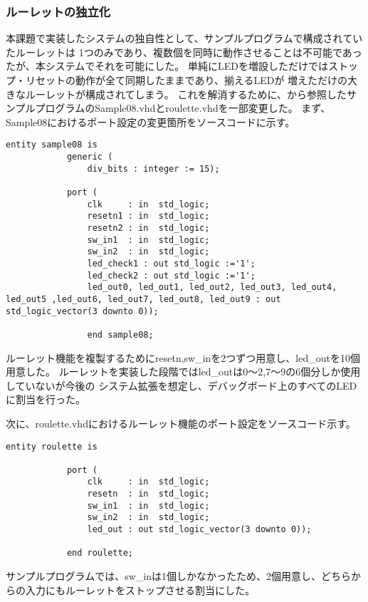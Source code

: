 \documentclass{ltjsarticle}
\begin{document}
		\subsubsection{ルーレットの独立化}
			本課題で実装したシステムの独自性として、サンプルプログラムで構成されていたルーレットは
			1つのみであり、複数個を同時に動作させることは不可能であったが、本システムでそれを可能にした。
			単純にLEDを増設しただけではストップ・リセットの動作が全て同期したままであり、揃えるLEDが
			増えただけの大きなルーレットが構成されてしまう。
			これを解消するために、\cite{ref:指導書}から参照したサンプルプログラムのSample08.vhdとroulette.vhdを一部変更した。
			まず、Sample08におけるポート設定の変更箇所をソースコードに示す。

			\begin{lstlisting}[caption = Sample08のポート設定, label = code:Sample08port]
			entity sample08 is
			generic (
				div_bits : integer := 15);
			
			port (
				clk     : in  std_logic;
				resetn1 : in  std_logic;
				resetn2 : in  std_logic;
				sw_in1  : in  std_logic;
				sw_in2  : in  std_logic;
				led_check1 : out std_logic :='1';
				led_check2 : out std_logic :='1';
				led_out0, led_out1, led_out2, led_out3, led_out4, led_out5 ,led_out6, led_out7, led_out8, led_out9 : out std_logic_vector(3 downto 0));

				end sample08;
			\end{lstlisting}

			ルーレット機能を複製するためにresetn,sw\_inを2つずつ用意し、led\_outを10個用意した。
			ルーレットを実装した段階ではled\_outは0〜2,7〜9の6個分しか使用していないが今後の
			システム拡張を想定し、デバッグボード上のすべてのLEDに割当を行った。

			次に、roulette.vhdにおけるルーレット機能のポート設定をソースコード示す。
			\begin{lstlisting}[caption = roulette.vhd::ルーレット機能のポート設定, label = code:roulettePort]
			entity roulette is
			
			port (
				clk     : in  std_logic;
				resetn  : in  std_logic;
				sw_in1  : in  std_logic;
				sw_in2  : in  std_logic;
				led_out : out std_logic_vector(3 downto 0));

			end roulette;
			\end{lstlisting}
			サンプルプログラムでは、sw\_inは1個しかなかったため、2個用意し、どちらからの入力にもルーレットをストップさせる割当にした。
\end{document}
